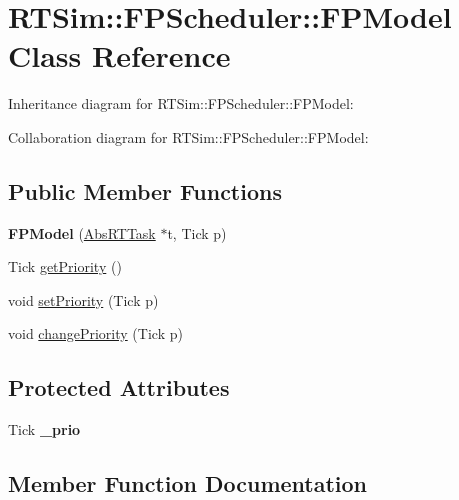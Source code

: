 \hypertarget{classRTSim_1_1FPScheduler_1_1FPModel}{}\section{R\+T\+Sim\+:\+:F\+P\+Scheduler\+:\+:F\+P\+Model Class Reference}
\label{classRTSim_1_1FPScheduler_1_1FPModel}


Inheritance diagram for R\+T\+Sim\+:\+:F\+P\+Scheduler\+:\+:F\+P\+Model\+:


Collaboration diagram for R\+T\+Sim\+:\+:F\+P\+Scheduler\+:\+:F\+P\+Model\+:
\subsection*{Public Member Functions}
\begin{DoxyCompactItemize}
\item 
{\bfseries F\+P\+Model} (\hyperlink{classRTSim_1_1AbsRTTask}{Abs\+R\+T\+Task} $\ast$t, Tick p)\hypertarget{classRTSim_1_1FPScheduler_1_1FPModel_af8cd2b14cb0ecef905a8afe711ca9c18}{}\label{classRTSim_1_1FPScheduler_1_1FPModel_af8cd2b14cb0ecef905a8afe711ca9c18}

\item 
Tick \hyperlink{classRTSim_1_1FPScheduler_1_1FPModel_ab8ee7b4c0e162602e255c73c25d241a9}{get\+Priority} ()
\item 
void \hyperlink{classRTSim_1_1FPScheduler_1_1FPModel_aae8d0c7c46bac0f9178079d8d8dd0daf}{set\+Priority} (Tick p)
\item 
void \hyperlink{classRTSim_1_1FPScheduler_1_1FPModel_a7b796d531658e5bcb6202693f9532567}{change\+Priority} (Tick p)
\end{DoxyCompactItemize}
\subsection*{Protected Attributes}
\begin{DoxyCompactItemize}
\item 
Tick {\bfseries \+\_\+prio}\hypertarget{classRTSim_1_1FPScheduler_1_1FPModel_ae7e92b6637436d3f3d743a808794d36c}{}\label{classRTSim_1_1FPScheduler_1_1FPModel_ae7e92b6637436d3f3d743a808794d36c}

\end{DoxyCompactItemize}


\subsection{Member Function Documentation}
